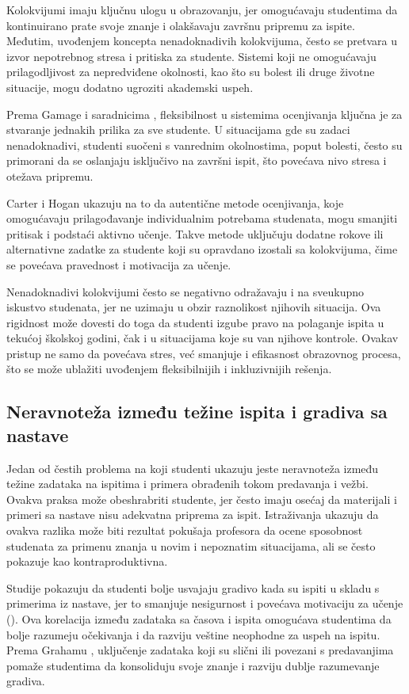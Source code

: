 \documentclass[a4paper]{article}
\begin{document}
Kolokvijumi imaju ključnu ulogu u obrazovanju, jer omogućavaju studentima da kontinuirano prate svoje znanje i olakšavaju završnu pripremu za ispite. Međutim, uvođenjem koncepta nenadoknadivih kolokvijuma, često se pretvara u izvor nepotrebnog stresa i pritiska za studente. Sistemi koji ne omogućavaju prilagodljivost za nepredviđene okolnosti, kao što su bolest ili druge životne situacije, mogu dodatno ugroziti akademski uspeh.

Prema Gamage i saradnicima \cite{gamage2022rethinking}, fleksibilnost u sistemima ocenjivanja ključna je za stvaranje jednakih prilika za sve studente. U situacijama gde su zadaci nenadoknadivi, studenti suočeni s vanrednim okolnostima, poput bolesti, često su primorani da se oslanjaju isključivo na završni ispit, što povećava nivo stresa i otežava pripremu.

Carter i Hogan \cite{carter2013authentic} ukazuju na to da autentične metode ocenjivanja, koje omogućavaju prilagođavanje individualnim potrebama studenata, mogu smanjiti pritisak i podstaći aktivno učenje. Takve metode uključuju dodatne rokove ili alternativne zadatke za studente koji su opravdano izostali sa kolokvijuma, čime se povećava pravednost i motivacija za učenje.

Nenadoknadivi kolokvijumi često se negativno odražavaju i na sveukupno iskustvo studenata, jer ne uzimaju u obzir raznolikost njihovih situacija. Ova rigidnost može dovesti do toga da studenti izgube pravo na polaganje ispita u tekućoj školskoj godini, čak i u situacijama koje su van njihove kontrole. Ovakav pristup ne samo da povećava stres, već smanjuje i efikasnost obrazovnog procesa, što se može ublažiti uvođenjem fleksibilnijih i inkluzivnijih rešenja.

\subsection{Neravnoteža između težine ispita i gradiva sa nastave}

Jedan od čestih problema na koji studenti ukazuju jeste neravnoteža između težine zadataka na ispitima i primera obrađenih tokom predavanja i vežbi. Ovakva praksa može obeshrabriti studente, jer često imaju osećaj da materijali i primeri sa nastave nisu adekvatna priprema za ispit. Istraživanja ukazuju da ovakva razlika može biti rezultat pokušaja profesora da ocene sposobnost studenata za primenu znanja u novim i nepoznatim situacijama, ali se često pokazuje kao kontraproduktivna.

Studije pokazuju da studenti bolje usvajaju gradivo kada su ispiti u skladu s primerima iz nastave, jer to smanjuje nesigurnost i povećava motivaciju za učenje (\cite{sambell2013assessment}). Ova korelacija između zadataka sa časova i ispita omogućava studentima da bolje razumeju očekivanja i da razviju veštine neophodne za uspeh na ispitu. Prema Grahamu \cite{graham1999practice}, uključenje zadataka koji su slični ili povezani s predavanjima pomaže studentima da konsoliduju svoje znanje i razviju dublje razumevanje gradiva.
\end{document}
